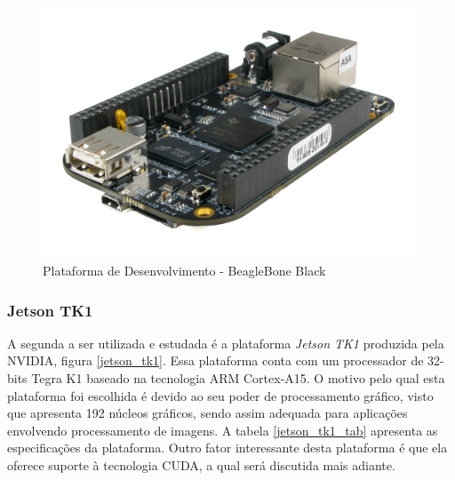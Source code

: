 \begin{figure}[H]
	\centering
	\includegraphics[scale=0.10]{./Resources/bbb.jpg}
	\caption{Plataforma de Desenvolvimento - BeagleBone Black}
	\label{bbb}
\end{figure}


\subsubsection{Jetson TK1}

A segunda a ser utilizada e estudada é a plataforma \textit{Jetson TK1} produzida pela NVIDIA, figura \ref{jetson_tk1}. Essa plataforma conta com um processador de 32-bits Tegra K1 baseado na tecnologia ARM Cortex-A15. O motivo pelo qual esta plataforma foi escolhida é devido ao seu poder de processamento gráfico, visto que apresenta 192 núcleos gráficos, sendo assim adequada para aplicações envolvendo processamento de imagens. A tabela \ref{jetson_tk1_tab} apresenta as especificações da plataforma. Outro fator interessante desta plataforma é que ela oferece suporte à tecnologia CUDA, a qual será discutida mais adiante.

